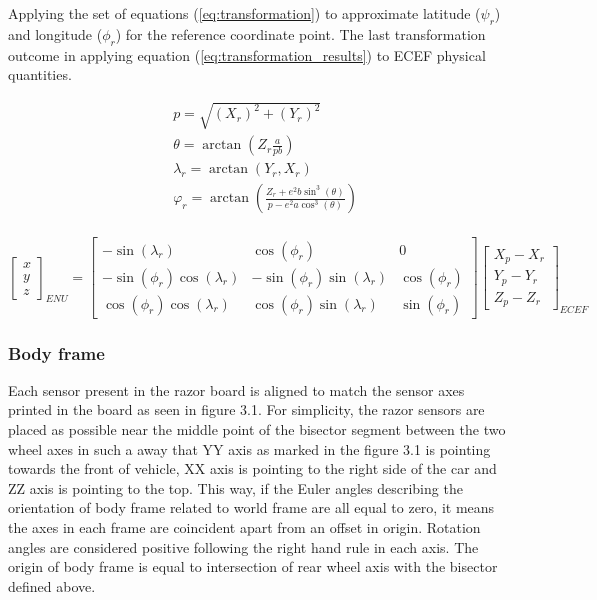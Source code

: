 Applying the set of equations (\ref{eq:transformation}) to approximate latitude ($\psi_r$) and longitude ($\phi_r$) for the reference coordinate point. The last transformation outcome in applying equation (\ref{eq:transformation_results}) to ECEF physical quantities.

\begin{equation}
    \begin{aligned}
         & p = \sqrt{(X_r)^2 + (Y_r)^2}                                                      \\
         & \theta = \arctan(Z_r\frac{a}{pb} )                                                \\
         & \lambda_r = \arctan(Y_r,X_r)                                                      \\
         & \varphi_r = \arctan(\frac{Z_r + e^2 b\sin^3(\theta)}{p - e^2 a \cos^3(\theta )} ) \\
    \end{aligned}
    \label{eq:transformation}
\end{equation}

\begin{equation}
    \begin{bmatrix}
        x \\
        y \\
        z
    \end{bmatrix}_{ENU}
    =
    \begin{bmatrix}
        -\sin(\lambda_r)             & \cos( \phi_r)                  & 0            \\
        -\sin(\phi_r)\cos(\lambda_r) & -\sin( \phi_r)\sin(\lambda_r)  & \cos(\phi_r) \\
        \cos(\phi_r)\cos(\lambda_r)  & \cos( \phi_r)  \sin(\lambda_r) & \sin(\phi_r)
    \end{bmatrix}
    \begin{bmatrix}
        X_p - X_r \\
        Y_p - Y_r \\
        Z_p - Z_r
    \end{bmatrix}_{ECEF}
    \label{eq:transformation_results}
\end{equation}

\subsubsection{Body frame}

Each sensor present in the razor board is aligned to match the sensor axes printed in the board as seen in figure 3.1. For simplicity, the razor sensors are placed as possible near the middle point of the bisector segment between the two wheel axes in such a away that YY axis as marked in the figure 3.1 is pointing towards the front of vehicle, XX axis is pointing to the right side of the car and ZZ axis is pointing to the top. This way, if the Euler angles describing the orientation of body frame related to world frame are all equal to zero, it means the axes in each frame are coincident apart from an offset in origin. Rotation angles are considered positive following the right hand rule in each axis. The origin of body frame is equal to intersection of rear wheel axis with the bisector defined above.

